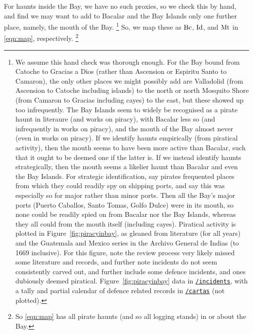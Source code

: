 		For haunts inside the Bay, we have no such proxies, so we check this by hand, and find we may want to add to Bacalar and the Bay Islands only one further place, namely, the mouth of the Bay.%
		\footnote{We assume this hand check was thorough enough. For the Bay bound from Catoche to Gracias a Dios (rather than Ascension or Espiritu Santo to Camaron), the only other places we might possibly add are Valladolid (from Ascension to Catoche including islands) to the north or north Mosquito Shore (from Camaron to Gracias including cayes) to the east, but these showed up too infrequently. The Bay Islands seem to widely be recognised as a pirate haunt in literaure (and works on piracy), with Bacalar less so (and infrequently in works on piracy), and the mouth of the Bay almost never (even in works on piracy). If we identify haunts empirically (from piratical activity), then the mouth seems to have been more active than Bacalar, such that it ought to be deemed one if the latter is. If we instead identify haunts strategically, then the mouth seems a likelier haunt than Bacalar and even the Bay Islands. For strategic identification, say pirates frequented places from which they could readily spy on shipping ports, and say this was especially so for major rather than minor ports. Then all the Bay's major ports (Puerto Caballos, Santo Tomas, Golfo Dulce) were in its mouth, so none could be readily spied on from Bacalar nor the Bay Islands, whereas they all could from the mouth itself (including cayes). Piratical activity is plotted in Figure~\ref{fig:piracyinbay}, as gleaned from literature (for all years) and the Guatemala and Mexico series in the Archivo General de Indias (to 1669 inclusive). For this figure, note the review process very likely missed some literature and records, and further note incidents do not seem consistently carved out, and further include some defence incidents, and ones dubiously deemed piratical. Figure~\ref{fig:piracyinbay} data in \href{https://github.com/aenavidad/pp-0/tree/main/incidents}{\nolinkurl{/incidents}}, with a tally and partial calendar of defence related records in \href{https://github.com/aenavidad/pp-0/tree/main/cartas}{\nolinkurl{/cartas}} (not plotted).}
		So, we map these as \(\operatorname{Bc}\), \(\operatorname{Id}\), and \(\operatorname{Mt}\) in \ref{eqn:map}, respectively.%
		\footnote{So \ref{eqn:map} has all pirate haunts (and so all logging stands) in or about the Bay.}
	
